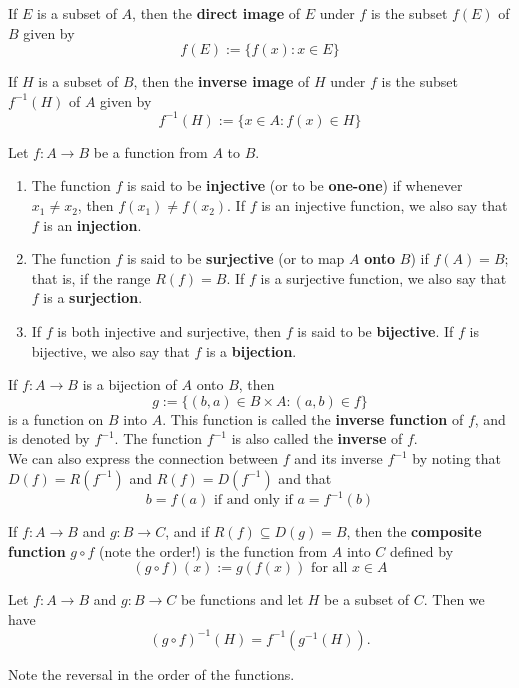 \begin{definition}
	If $E$ is a subset of $A$, then the \textbf{direct image} of $E$ under $f$ is the subset $f(E)$ of $B$ given by
	\[f(E):=\{f(x):x \in E\}\]

	If $H$ is a subset of $B$, then the \textbf{inverse image} of $H$ under $f$ is the subset $f^{-1}(H)$ of $A$ given by
	\[f^{-1}(H):=\{x \in A:f(x) \in H\}\]
\end{definition}

\begin{definition}
	Let $f:A \rightarrow B$ be a function from $A$ to $B$.
	\begin{enumerate}
		\item The function $f$ is said to be \textbf{injective} (or to be \textbf{one-one}) if whenever $x_1 \neq x_2$, then $f(x_1) \neq f(x_2)$. If $f$ is an injective function, we also say that $f$ is an \textbf{injection}.

		\item The function $f$ is said to be \textbf{surjective} (or to map $A$ \textbf{onto} $B$) if $f(A)=B$; that is, if the range $R(f)=B$. If $f$ is a surjective function, we also say that $f$ is a \textbf{surjection}.

		\item If $f$ is both injective and surjective, then $f$ is said to be \textbf{bijective}. If $f$ is bijective, we also say that $f$ is a \textbf{bijection}.
	\end{enumerate}
\end{definition}

\begin{definition}
	If $f: A \rightarrow B$ is a bijection of $A$ onto $B$, then
	\[g := \{(b,a) \in B \times A: (a,b) \in f\}\]
	is a function on $B$ into $A$. This function is called the \textbf{inverse function} of $f$, and is denoted by $f^{-1}$. The function $f^{-1}$ is also called the \textbf{inverse} of $f$.
	\\We can also express the connection between $f$ and its inverse $f^{-1}$ by noting that $D(f)=R(f^{-1})$ and $R(f)=D(f^{-1})$ and that
	\[b=f(a) \text{ if and only if } a=f^{-1}(b)\]
\end{definition}

\begin{definition}
	If $f: A \rightarrow B$ and $g:B \rightarrow C$, and if $R(f) \subseteq D(g) = B$, then the \textbf{composite function} $g \circ f$ (note the order!) is the function from $A$ into $C$ defined by
	\[(g \circ f)(x) := g(f(x)) \text{ for all } x \in A\]
\end{definition}

\begin{theorem}
	Let $f: A \rightarrow B$ and $g: B \rightarrow C$ be functions and let $H$ be a subset of $C$. Then we have
	\[(g \circ f)^{-1}(H) = f^{-1}(g^{-1}(H)).\]

	Note the reversal in the order of the functions.
\end{theorem}
